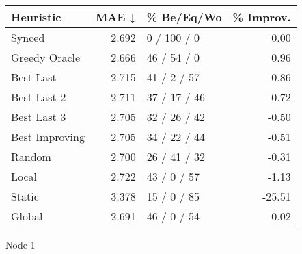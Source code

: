 \begin{tabular}{lrlr}
\toprule
\textbf{Heuristic} & \textbf{MAE ↓} & \textbf{\% Be/Eq/Wo} & \textbf{\% Improv.} \\
\midrule
            Synced &          2.692 &          0 / 100 / 0 &                0.00 \\
     Greedy Oracle &          2.666 &          46 / 54 / 0 &                0.96 \\
         Best Last &          2.715 &          41 / 2 / 57 &               -0.86 \\
       Best Last 2 &          2.711 &         37 / 17 / 46 &               -0.72 \\
       Best Last 3 &          2.705 &         32 / 26 / 42 &               -0.50 \\
    Best Improving &          2.705 &         34 / 22 / 44 &               -0.51 \\
            Random &          2.700 &         26 / 41 / 32 &               -0.31 \\
             Local &          2.722 &          43 / 0 / 57 &               -1.13 \\
            Static &          3.378 &          15 / 0 / 85 &              -25.51 \\
            Global &          2.691 &          46 / 0 / 54 &                0.02 \\
\bottomrule
\end{tabular}
\caption{Node 1}
\label{tab:hr_iid_lr01_le2_bs4_1}
